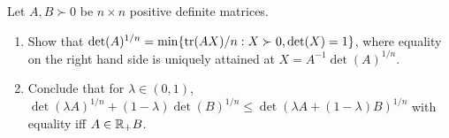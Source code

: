 \begin{exercise}
Let $A,B \succ 0$ be $n \times n$ positive definite matrices.
\begin{enumerate}
\item Show that $\det(A)^{1/n} = \min \{{{\rm tr}(AX)/n: X \succ 0,
\det(X)=1}\}$, where equality on the right hand side is uniquely attained at 
$X = A^{-1} \det(A)^{1/n}$. 
\item Conclude that for $\lambda \in (0,1)$, 
$\det(\lambda A)^{1/n} + (1-\lambda) \det(B)^{1/n} \leq \det(\lambda A +
(1-\lambda)B)^{1/n}$ with equality iff $A \in \mathbb{R}_+ B$. 
\end{enumerate}
\end{exercise}

